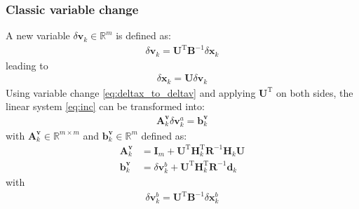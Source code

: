 \documentclass[12pt]{scrartcl}
\begin{document}
\subsubsection{Classic variable change}
A new variable $\delta \mathbf{v}_k \in \mathbb{R}^m$ is defined as:
\begin{align}
\label{eq:deltav}
\delta \mathbf{v}_k = \mathbf{U}^\mathrm{T} \mathbf{B}^{-1} \delta \mathbf{x}_k
\end{align}
leading to
\begin{align}
\label{eq:deltax_to_deltav}
\boxed{\delta \mathbf{x}_k = \mathbf{U} \delta \mathbf{v}_k}
\end{align}
Using variable change \eqref{eq:deltax_to_deltav} and applying $\mathbf{U}^\mathrm{T}$ on both sides, the linear system \eqref{eq:inc} can be transformed into:
\begin{align}
\label{eq:inc_U}
\boxed{\mathbf{A}^\mathbf{v}_k \delta \mathbf{v}^a_k = \mathbf{b}^\mathbf{v}_k}
\end{align}
with $\mathbf{A}^\mathbf{v}_k \in \mathbb{R}^{m \times m}$ and $\mathbf{b}^\mathbf{v}_k \in \mathbb{R}^{m}$ defined as:
\begin{align}
\mathbf{A}^\mathbf{v}_k & = \mathbf{I}_m + \mathbf{U}^\mathrm{T} \mathbf{H}_k^\mathrm{T} \mathbf{R}^{-1} \mathbf{H}_k \mathbf{U} \\
\mathbf{b}^\mathbf{v}_k & = \delta \mathbf{v}^b_k + \mathbf{U}^\mathrm{T} \mathbf{H}_k^\mathrm{T} \mathbf{R}^{-1} \mathbf{d}_k
\end{align}
with
\begin{align}
\delta \mathbf{v}^b_k = \mathbf{U}^\mathrm{T} \mathbf{B}^{-1} \delta \mathbf{x}^b_k
\end{align}
\end{document}
